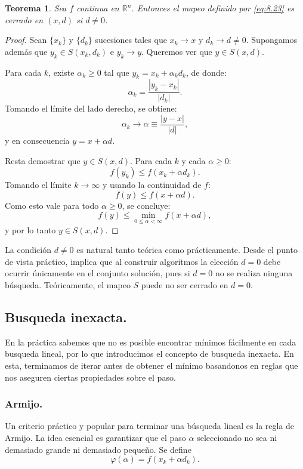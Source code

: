 \documentclass[11pt]{article}
\theoremstyle{ejstyle}
\newtheorem{teo}{Teorema}
\theoremstyle{ejstyle}
\theoremstyle{ejstyle}
\theoremstyle{ejstyle}
\theoremstyle{ejstyle}
\theoremstyle{ejstyle}
\theoremstyle{ejstyle}
\newcommand{\R}{\mathbb{R}}
\begin{document}
	\begin{teo}
		Sea $f$ continua en $\R^n$. Entonces el mapeo definido por \eqref{eq:8.23} es cerrado en $(x, d)$ si $d \neq 0$.
	\end{teo}
	
	\begin{proof}
		Sean $\{x_k\}$ y $\{d_k\}$ sucesiones tales que $x_k \to x$ y $d_k \to d \neq 0$. Supongamos además que $y_k \in S(x_k, d_k)$ e $y_k \to y$. Queremos ver que $y \in S(x, d)$.
		
		Para cada $k$, existe $\alpha_k \geq 0$ tal que $y_k = x_k + \alpha_k d_k$, de donde:
		\[
		\alpha_k = \frac{|y_k - x_k|}{|d_k|}.
		\]
		Tomando el límite del lado derecho, se obtiene:
		\[
		\alpha_k \to \alpha \equiv \frac{|y - x|}{|d|},
		\]
		y en consecuencia $y = x + \alpha d$.
		
		Resta demostrar que $y \in S(x, d)$. Para cada $k$ y cada $\alpha \geq 0$:
		\[
		f(y_k) \leq f(x_k + \alpha d_k).
		\]
		Tomando el límite $k \to \infty$ y usando la continuidad de $f$:
		\[
		f(y) \leq f(x + \alpha d).
		\]
		Como esto vale para todo $\alpha \geq 0$, se concluye:
		\[
		f(y) \leq \min_{0 \leq \alpha < \infty} f(x + \alpha d),
		\]
		y por lo tanto $y \in S(x, d)$.
	\end{proof}
	
	La condición $d \neq 0$ es natural tanto teórica como prácticamente. Desde el punto de vista práctico, implica que al construir algoritmos la elección $d = 0$ debe ocurrir únicamente en el conjunto solución, pues si $d = 0$ no se realiza ninguna búsqueda. Teóricamente, el mapeo $S$ puede no ser cerrado en $d = 0$.
	
	\subsection{Busqueda inexacta.}
	
	En la práctica sabemos que no es posible encontrar mínimos fácilmente en cada busqueda lineal, por lo que introducimos el concepto de busqueda inexacta. En esta, terminamos de iterar antes de obtener el mínimo basandonos en reglas que nos aseguren ciertas propiedades sobre el paso.
	
	\subsubsection{Armijo.}
	
	Un criterio práctico y popular para terminar una búsqueda lineal es la regla de Armijo. La idea esencial es garantizar que el paso $\alpha$ seleccionado no sea ni demasiado grande ni demasiado pequeño. Se define
	\[
	\varphi(\alpha) = f(x_k + \alpha d_k).
	\]
	
\end{document}
